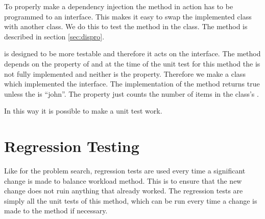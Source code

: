 To properly make a dependency injection the method in action has to be programmed to an interface. 
This makes it easy to swap the implemented class with another class. 
We do this to test the method  in the  class. 
The method is described in section \ref{sec:dispro}.

 is designed to be more testable and therefore it acts on the  interface. 
The method depends on the  property of  and at the time of the unit test for this method the  is not fully implemented and neither is the  property. 
Therefore we make a  class which implemented the  interface.
The  implementation of the  method returns true unless the  is ``john''. 
The  property just counts the number of items in the  class's . 

In this way it is possible to make a unit test work.

\section{Regression Testing}
\label{sec:regression_balance_workload}
Like for the problem search, regression tests are used every time a significant change is made to balance workload method.
This is to ensure that the new change does not ruin anything that already worked.
The regression tests are simply all the unit tests of this method, which can be run every time a change is made to the method if necessary.
